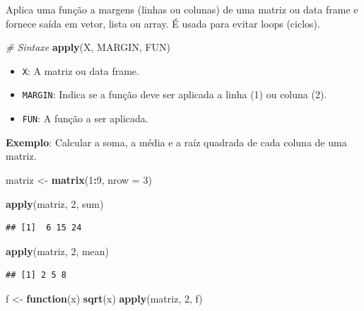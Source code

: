\documentclass[
]{book}
\newenvironment{Shaded}{\begin{snugshade}}{\end{snugshade}}
\newcommand{\AttributeTok}[1]{\textcolor[rgb]{0.13,0.29,0.53}{#1}}
\newcommand{\CommentTok}[1]{\textcolor[rgb]{0.56,0.35,0.01}{\textit{#1}}}
\newcommand{\ControlFlowTok}[1]{\textcolor[rgb]{0.13,0.29,0.53}{\textbf{#1}}}
\newcommand{\DecValTok}[1]{\textcolor[rgb]{0.00,0.00,0.81}{#1}}
\newcommand{\FunctionTok}[1]{\textcolor[rgb]{0.13,0.29,0.53}{\textbf{#1}}}
\newcommand{\NormalTok}[1]{#1}
\newcommand{\OtherTok}[1]{\textcolor[rgb]{0.56,0.35,0.01}{#1}}
\newcommand{\SpecialCharTok}[1]{\textcolor[rgb]{0.81,0.36,0.00}{\textbf{#1}}}
\begin{document}
Aplica uma função a margens (linhas ou colunas) de uma matriz ou data frame e fornece saída em vetor, lista ou array. É usada para evitar loops (ciclos).

\begin{Shaded}
\begin{Highlighting}[]
\CommentTok{\# Sintaxe}
\FunctionTok{apply}\NormalTok{(X, MARGIN, FUN)}
\end{Highlighting}
\end{Shaded}

\begin{itemize}
\item
  \texttt{X}: A matriz ou data frame.
\item
  \texttt{MARGIN}: Indica se a função deve ser aplicada a linha (1) ou coluna (2).
\item
  \texttt{FUN}: A função a ser aplicada.
\end{itemize}

\textbf{Exemplo}: Calcular a soma, a média e a raíz quadrada de cada coluna de uma matriz.

\begin{Shaded}
\begin{Highlighting}[]
\NormalTok{matriz }\OtherTok{\textless{}{-}} \FunctionTok{matrix}\NormalTok{(}\DecValTok{1}\SpecialCharTok{:}\DecValTok{9}\NormalTok{, }\AttributeTok{nrow =} \DecValTok{3}\NormalTok{)}

\FunctionTok{apply}\NormalTok{(matriz, }\DecValTok{2}\NormalTok{, sum)}
\end{Highlighting}
\end{Shaded}

\begin{verbatim}
## [1]  6 15 24
\end{verbatim}

\begin{Shaded}
\begin{Highlighting}[]
\FunctionTok{apply}\NormalTok{(matriz, }\DecValTok{2}\NormalTok{, mean)}
\end{Highlighting}
\end{Shaded}

\begin{verbatim}
## [1] 2 5 8
\end{verbatim}

\begin{Shaded}
\begin{Highlighting}[]
\NormalTok{f }\OtherTok{\textless{}{-}} \ControlFlowTok{function}\NormalTok{(x) }\FunctionTok{sqrt}\NormalTok{(x)}
\FunctionTok{apply}\NormalTok{(matriz, }\DecValTok{2}\NormalTok{, f)}
\end{Highlighting}
\end{Shaded}
\end{document}
